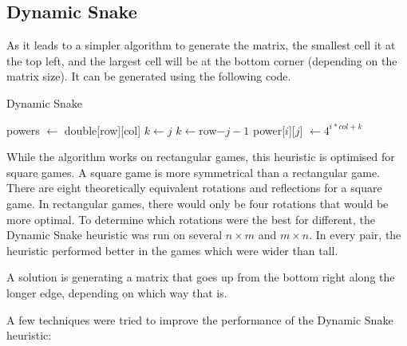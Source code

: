 \documentclass{article}
\begin{document}
\subsection{Dynamic Snake}
As it leads to a simpler algorithm to generate the matrix, the smallest cell it at the top left, and the largest cell will be at the bottom corner (depending on the matrix size).
It can be generated using the following code. 
\begin{algorithm}
\caption{Dynamic Snake}\label{DynamicSnake} 
\begin{algorithmic}[1]
\State powers $\gets$ double[row][col]
\State $k \gets j$ 
\Else
\State $k \gets $row$ - j - 1$ 
\EndIf
\State power[$i$][$j$] $\gets 4^{i*col + k}$
\EndFor
\EndFor
\EndProcedure
\end{algorithmic}
\end{algorithm}
While the algorithm works on rectangular games, this heuristic is optimised for square games. A square game is more symmetrical than a rectangular game. There are eight theoretically equivalent rotations and reflections for a square game. In rectangular games, there would only be four rotations that would be more optimal. To determine which rotations were the best for different, the Dynamic Snake heuristic was run on several $n \times m$ and $m \times n$. In every pair, the heuristic performed better in the games which were wider than tall.

A solution is generating a matrix that goes up from the bottom right along the longer edge, depending on which way that is.

A few techniques were tried to improve the performance of the Dynamic Snake heuristic:
\end{document}
